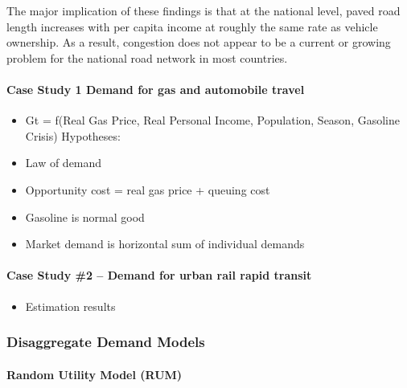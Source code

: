 \documentclass[]{article}
\providecommand{\tightlist}{%
  \setlength{\itemsep}{0pt}\setlength{\parskip}{0pt}}
\let\oldparagraph\paragraph
\renewcommand{\paragraph}[1]{\oldparagraph{#1}\mbox{}}
\begin{document}
The major implication of these findings is that at the national level,
paved road length increases with per capita income at roughly the same
rate as vehicle ownership. As a result, congestion does not appear to be
a current or growing problem for the national road network in most
countries.

\hypertarget{case-study-1-demand-for-gas-and-automobile-travel}{%
\paragraph{Case Study 1 Demand for gas and automobile
travel}\label{case-study-1-demand-for-gas-and-automobile-travel}}

\begin{itemize}
\item
  Gt = f(Real Gas Price, Real Personal Income, Population, Season,
  Gasoline Crisis) Hypotheses:
\item
  Law of demand
\item
  Opportunity cost = real gas price + queuing cost
\item
  Gasoline is normal good
\item
  Market demand is horizontal sum of individual demands
\end{itemize}

\hypertarget{case-study-2-demand-for-urban-rail-rapid-transit}{%
\paragraph{Case Study \#2 -- Demand for urban rail rapid
transit}\label{case-study-2-demand-for-urban-rail-rapid-transit}}

\begin{itemize}
\tightlist
\item
  Estimation results
\end{itemize}

\hypertarget{disaggregate-demand-models}{%
\subsubsection{Disaggregate Demand
Models}\label{disaggregate-demand-models}}

\hypertarget{random-utility-model-rum}{%
\paragraph{Random Utility Model (RUM)}\label{random-utility-model-rum}}
\end{document}
